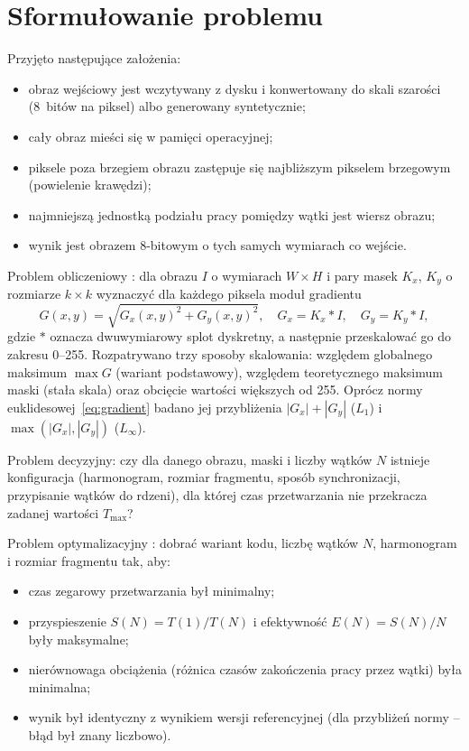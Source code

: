 \documentclass[12pt,a4paper]{article}
\begin{document}
\section{Sformułowanie problemu}

Przyjęto następujące założenia:
\begin{itemize}
	\item obraz wejściowy jest wczytywany z dysku i konwertowany do skali szarości (8~bitów na piksel) albo generowany syntetycznie;
	\item cały obraz mieści się w pamięci operacyjnej;
	\item piksele poza brzegiem obrazu zastępuje się najbliższym pikselem brzegowym (powielenie krawędzi);
	\item najmniejszą jednostką podziału pracy pomiędzy wątki jest wiersz obrazu;
	\item wynik jest obrazem 8-bitowym o tych samych wymiarach co wejście.
\end{itemize}

Problem obliczeniowy \cite{gonzalez,tadeusiewicz}: dla obrazu $I$ o wymiarach $W \times H$ i pary masek $K_x$, $K_y$ o rozmiarze $k \times k$ wyznaczyć dla każdego piksela moduł gradientu
\begin{equation}
	G(x, y) = \sqrt{G_x(x, y)^{2} + G_y(x, y)^{2}}, \quad G_x = K_x * I, \quad G_y = K_y * I,
	\label{eq:gradient}
\end{equation}
gdzie $*$ oznacza dwuwymiarowy splot dyskretny, a następnie przeskalować go do zakresu 0--255. Rozpatrywano trzy sposoby skalowania: względem globalnego maksimum $\max G$ (wariant podstawowy), względem teoretycznego maksimum maski (stała skala) oraz obcięcie wartości większych od 255. Oprócz normy euklidesowej~\eqref{eq:gradient} badano jej przybliżenia $|G_x| + |G_y|$ ($L_1$) i $\max(|G_x|, |G_y|)$ ($L_\infty$).

Problem decyzyjny: czy dla danego obrazu, maski i liczby wątków $N$ istnieje konfiguracja (harmonogram, rozmiar fragmentu, sposób synchronizacji, przypisanie wątków do rdzeni), dla której czas przetwarzania nie przekracza zadanej wartości $T_{\max}$?

Problem optymalizacyjny \cite{williams,openmp}: dobrać wariant kodu, liczbę wątków $N$, harmonogram i rozmiar fragmentu tak, aby:
\begin{itemize}
	\item czas zegarowy przetwarzania był minimalny;
	\item przyspieszenie $S(N) = T(1)/T(N)$ i efektywność $E(N) = S(N)/N$ były maksymalne;
	\item nierównowaga obciążenia (różnica czasów zakończenia pracy przez wątki) była minimalna;
	\item wynik był identyczny z wynikiem wersji referencyjnej (dla przybliżeń normy -- błąd był znany liczbowo).
\end{itemize}
\end{document}

